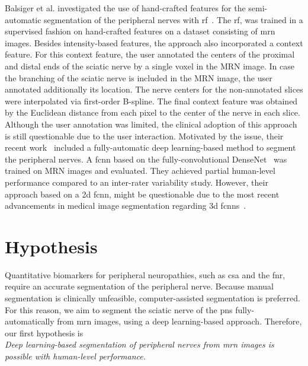 Balsiger et al. investigated the use of hand-crafted features for the semi-automatic segmentation of the peripheral nerves with \gls{rf}~\cite{Balsiger2018Semi-automaticNeurography}. The \gls{rf}, was trained in a supervised fashion on hand-crafted features on a dataset consisting of \gls{mrn} images. Besides intensity-based features, the approach also incorporated a context feature. For this context feature, the user annotated the centers of the proximal and distal ends of the sciatic nerve by a single voxel in the MRN image. In case the branching of the sciatic nerve is included in the MRN image, the user annotated additionally its location. The nerve centers for the non-annotated slices were interpolated via first-order B-spline. The final context feature was obtained by the Euclidean distance from each pixel to the center of the nerve in each slice. Although the user annotation was limited, the clinical adoption of this approach is still questionable due to the user interaction. Motivated by the issue, their recent work~\cite{Balsiger2018SegmentationApproach} included a fully-automatic deep learning-based method to segment the peripheral nerves. A \gls{fcnn} based on the fully-convolutional DenseNet~\cite{Huang2017DenselyNetworks} was trained on MRN images and evaluated. They achieved partial human-level performance compared to an inter-rater variability study. However, their approach based on a \gls{2d} \gls{fcnn}, might be questionable due to the most recent advancements in medical image segmentation regarding \gls{3d} \gls{fcnn}s~\cite{Cicek20163DAnnotation,Baumgartner2017AnSegmentation,Oktay2018AnatomicallySegmentation,Tetteh2018DeepVesselNet:Volumes}.\\

\section{Hypothesis} %
Quantitative biomarkers for peripheral neuropathies, such as \gls{csa} and the \gls{fnr}, require an accurate segmentation of the peripheral nerve. Because manual segmentation is clinically unfeasible, computer-assisted segmentation is preferred.
For this reason, we aim to segment the sciatic nerve of the \gls{pns} fully-automatically from \acrshort{mrn} images, using a deep learning-based approach. Therefore, our first hypothesis is\\

\textit{Deep learning-based segmentation of peripheral nerves from \gls{mrn} images is possible with human-level performance.} \\

